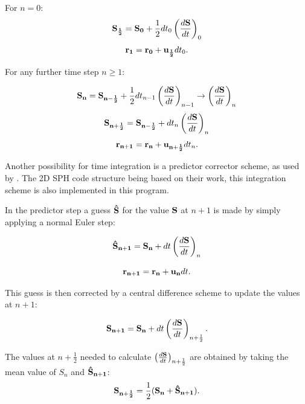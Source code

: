 \documentclass{report}
\begin{document}
For $n=0$:
\begin{equation}
{\bf S_{\frac{1}{2}}}={\bf S_0}+\frac{1}{2}dt_0\left(\frac{d{\bf S}}{dt}\right)_0
\end{equation}
\begin{equation}
{\bf r_1}={\bf r_0}+{\bf u_{\frac{1}{2}}}dt_0 .
\end{equation}

For any further time step $n\ge1$:

\begin{equation}
{\bf S_n}={\bf S_{n-\frac{1}{2}}}+\frac{1}{2}dt_{n-1}\left(\frac{d{\bf S}}{dt}\right)_{n-1} \rightarrow
\left(\frac{d{\bf S}}{dt}\right)_n 
\end{equation}
\begin{equation}
{\bf S_{n+\frac{1}{2}}}={\bf S_{n-\frac{1}{2}}}+dt_n\left(\frac{d{\bf S}}{dt}\right)_n 
\end{equation}
\begin{equation}
{\bf r_{n+1}}={\bf r_n}+{\bf u_{n+\frac{1}{2}}}dt_n .
\end{equation}

Another possibility for time integration is a predictor corrector scheme, as
used by \cite{Hu2007}.
The 2D SPH code structure being based on their work,
this integration scheme is also implemented in this program.

In the predictor step a guess ${\bf \hat S}$ for the value ${\bf S}$ at $n+1$ is made by simply
applying a normal Euler step:

\begin{equation}
{\bf \hat S_{n+1}}={\bf S_n}+dt\left(\frac{d{\bf S}}{dt}\right)_n
\end{equation}

\begin{equation}
{\bf r_{n+1}}={\bf r_n}+ {\bf u_{n}}dt.
\end{equation}

This guess is then corrected by a central difference scheme to update the values at
$n+1$:

\begin{equation}
{\bf S_{n+1}}={\bf S_n}+dt\left(\frac{d{\bf S}}{dt}\right)_{n+\frac{1}{2}}.
\end{equation}

The values at $n+\frac{1}{2}$ needed to calculate
$\left(\frac{d{\bf S}}{dt}\right)_{n+\frac{1}{2}}$ are obtained by taking the mean value of
$S_n$ and ${\bf \hat S_{n+1}}$:
\begin{equation}
{\bf S_{n+\frac{1}{2}}}=\frac{1}{2}({\bf S_n}+{\bf \hat S_{n+1}}).
\end{equation}
\end{document}
